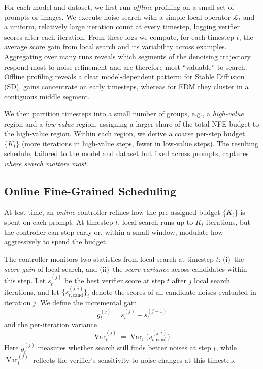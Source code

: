 For each model and dataset, we first run \emph{offline} profiling on a
small set of prompts or images.
We execute noise search with a simple local operator $\mathcal{L}_t$ and a uniform,
relatively large iteration count at every timestep, logging verifier
scores after each iteration.
From these logs we compute, for each timestep $t$, the
average score gain from local search and its variability across examples.
Aggregating over many runs reveals which segments of the
denoising trajectory respond most to noise refinement and
are therefore most ``valuable'' to search.
Offline profiling reveals a clear model-dependent pattern:
for Stable Diffusion (SD), gains concentrate on early timesteps,
whereas for EDM they cluster in a contiguous middle segment.

We then partition timesteps into a small number of groups,
e.g., a \emph{high-value} region and a \emph{low-value} region, assigning a
larger share of the total NFE budget to the high-value region.
Within each region, we derive a coarse per-step budget $\{K_t\}$ (more
iterations in high-value steps, fewer in low-value steps).
The resulting schedule, tailored to the model and dataset but fixed across
prompts, captures \emph{where search matters most}.

\subsection{Online Fine-Grained Scheduling}
\label{sec:online}

At test time, an \emph{online} controller refines how the
pre-assigned budget $\{K_t\}$ is spent on each prompt.
At timestep $t$, local search runs up to $K_t$ iterations, but the
controller can stop early or, within a small window, modulate how
aggressively to spend the budget.

The controller monitors two statistics from local search
at timestep $t$:
(i)~the \emph{score gain} of local search, and
(ii)~the \emph{score variance} across candidates within this step.
Let $s_t^{(j)}$ be the best verifier score at step $t$ after $j$ local search
iterations, and let $\{s_{t,\text{cand}}^{(j,i)}\}_i$ denote the scores of all
candidate noises evaluated in iteration $j$.
We define the incremental gain
\begin{equation}
  g_t^{(j)} = s_t^{(j)} - s_t^{(j-1)}
  \label{eq:gain-increment}
\end{equation}
and the per-iteration variance
\begin{equation}
  \operatorname{Var}_t^{(j)} = \operatorname{Var}_i\bigl(s_{t,\text{cand}}^{(j,i)}\bigr).
  \label{eq:var-iteration}
\end{equation}
Here $g_t^{(j)}$ measures whether search still finds
better noises at step $t$, while $\operatorname{Var}_t^{(j)}$ reflects the
verifier's sensitivity to noise changes at this timestep.

